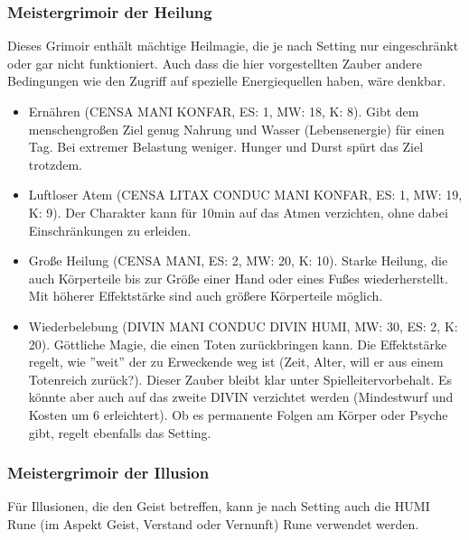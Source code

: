 \documentclass{article}
\begin{document}
\subsubsection{Meistergrimoir der Heilung}

Dieses Grimoir enthält mächtige Heilmagie, die je nach Setting nur eingeschränkt oder gar nicht funktioniert. Auch dass
die hier vorgestellten Zauber andere Bedingungen wie den Zugriff auf spezielle Energiequellen haben, wäre denkbar.

\begin{itemize}
\item Ernähren (CENSA MANI KONFAR, ES: 1, MW: 18, K: 8). Gibt dem menschengroßen Ziel genug Nahrung und Wasser (Lebensenergie) für einen Tag. Bei extremer Belastung weniger. Hunger und Durst spürt das Ziel trotzdem.
\item Luftloser Atem (CENSA LITAX CONDUC MANI KONFAR, ES: 1, MW: 19, K: 9). Der Charakter kann für 10min auf das Atmen verzichten, ohne dabei Einschränkungen zu erleiden.
\item Große Heilung (CENSA MANI, ES: 2, MW: 20, K: 10). Starke Heilung, die auch Körperteile bis zur Größe einer Hand oder eines Fußes wiederherstellt. Mit höherer Effektstärke sind auch größere Körperteile möglich.
\item Wiederbelebung (DIVIN MANI CONDUC DIVIN HUMI, MW: 30, ES: 2, K: 20). Göttliche Magie, die einen Toten zurückbringen kann. Die Effektstärke regelt, wie ''weit'' der zu Erweckende weg ist (Zeit, Alter, will er aus einem Totenreich zurück?). Dieser Zauber bleibt klar unter Spielleitervorbehalt. Es könnte aber auch auf das zweite DIVIN verzichtet werden (Mindestwurf und Kosten um 6 erleichtert). Ob es permanente Folgen am Körper oder Psyche gibt, regelt ebenfalls das Setting.
\end{itemize}

\subsubsection{Meistergrimoir der Illusion}

Für Illusionen, die den Geist betreffen, kann je nach Setting auch die HUMI Rune (im Aspekt Geist, Verstand oder
Vernunft) Rune verwendet werden.
\end{document}
